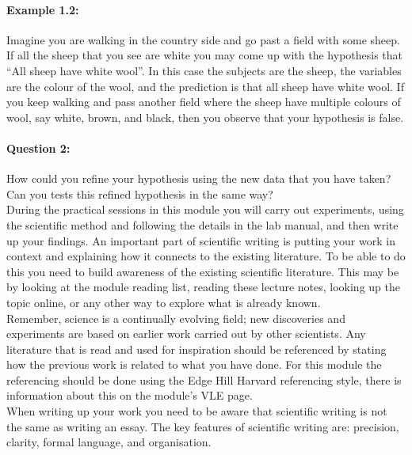 \documentclass[a4paper,12pt]{book}
\begin{document}
\paragraph{Example 1.2:}Imagine you are walking in the country side and go past a field with some sheep. If all the sheep that you see are white you may come up with the hypothesis that ``All sheep have white wool''. In this case the subjects are the sheep, the variables are the colour of the wool, and the prediction is that all sheep have white wool. If you keep walking and pass another field where the sheep have multiple colours of wool, say white, brown, and black, then you observe that your hypothesis is false.

\paragraph{Question 2:} How could you refine your hypothesis using the new data that you have taken? Can you tests this refined hypothesis in the same way?\\

During the practical sessions in this module you will carry out experiments, using the scientific method and following the details in the lab manual, and then write up your findings. An important part of scientific writing is putting your work in context and explaining how it connects to the existing literature. To be able to do this you need to build awareness of the existing scientific literature. This may be by looking at the module reading list, reading these lecture notes, looking up the topic online, or any other way to explore what is already known.\\

Remember, science is a continually evolving field; new discoveries and experiments are based on earlier work carried out by other scientists. Any literature that is read and used for inspiration should be referenced by stating how the previous work is related to what you have done. For this module the referencing should be done using the Edge Hill Harvard referencing style, there is information about this on the module's VLE page. \\

When writing up your work you need to be aware that scientific writing is not the same as writing an essay. The key features of scientific writing are: precision, clarity, formal language, and organisation. 
\end{document}
